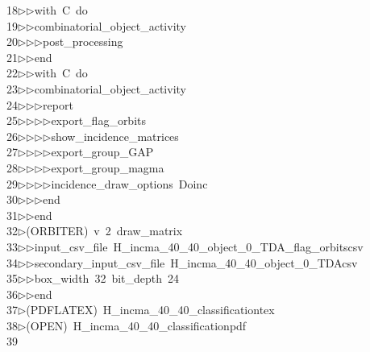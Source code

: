 \begin{tabbing}
18\>$\triangleright$\>$\triangleright$\>with\ C\ do\ \\[0pt]
19\>$\triangleright$\>$\triangleright$\>combinatorial\_object\_activity\ \\[0pt]
20\>$\triangleright$\>$\triangleright$\>$\triangleright$\>post\_processing\ \\[0pt]
21\>$\triangleright$\>$\triangleright$\>end\ \\[0pt]
22\>$\triangleright$\>$\triangleright$\>with\ C\ do\ \\[0pt]
23\>$\triangleright$\>$\triangleright$\>combinatorial\_object\_activity\ \\[0pt]
24\>$\triangleright$\>$\triangleright$\>$\triangleright$\>report\ \\[0pt]
25\>$\triangleright$\>$\triangleright$\>$\triangleright$\>$\triangleright$\>export\_flag\_orbits\ \\[0pt]
26\>$\triangleright$\>$\triangleright$\>$\triangleright$\>$\triangleright$\>show\_incidence\_matrices\ \\[0pt]
27\>$\triangleright$\>$\triangleright$\>$\triangleright$\>$\triangleright$\>export\_group\_GAP\ \\[0pt]
28\>$\triangleright$\>$\triangleright$\>$\triangleright$\>$\triangleright$\>export\_group\_magma\ \\[0pt]
29\>$\triangleright$\>$\triangleright$\>$\triangleright$\>$\triangleright$\>incidence\_draw\_options\ Doinc\ \\[0pt]
30\>$\triangleright$\>$\triangleright$\>$\triangleright$\>end\ \\[0pt]
31\>$\triangleright$\>$\triangleright$\>end\\[0pt]
32\>$\triangleright$\>(ORBITER)\ v\ 2\ draw\_matrix\ \\[0pt]
33\>$\triangleright$\>$\triangleright$\>input\_csv\_file\ H\_incma\_40\_40\_object\_0\_TDA\_flag\_orbitscsv\ \\[0pt]
34\>$\triangleright$\>$\triangleright$\>secondary\_input\_csv\_file\ H\_incma\_40\_40\_object\_0\_TDAcsv\ \\[0pt]
35\>$\triangleright$\>$\triangleright$\>box\_width\ 32\ bit\_depth\ 24\ \\[0pt]
36\>$\triangleright$\>$\triangleright$\>end\\[0pt]
37\>$\triangleright$\>(PDFLATEX)\ H\_incma\_40\_40\_classificationtex\\[0pt]
38\>$\triangleright$\>(OPEN)\ H\_incma\_40\_40\_classificationpdf\\[0pt]
39\>\end{tabbing}

